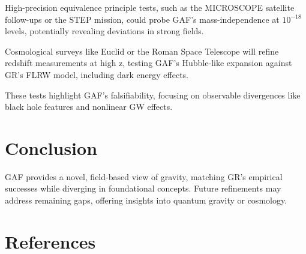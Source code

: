 \documentclass{article}
\begin{document}
High-precision equivalence principle tests, such as the MICROSCOPE satellite follow-ups or the STEP mission, could probe GAF's mass-independence at \( 10^{-18} \) levels, potentially revealing deviations in strong fields.

Cosmological surveys like Euclid or the Roman Space Telescope will refine redshift measurements at high z, testing GAF's Hubble-like expansion against GR's FLRW model, including dark energy effects.

These tests highlight GAF's falsifiability, focusing on observable divergences like black hole features and nonlinear GW effects.

\clearpage

\section{Conclusion}

GAF provides a novel, field-based view of gravity, matching GR's empirical successes while diverging in foundational concepts. Future refinements may address remaining gaps, offering insights into quantum gravity or cosmology.

\section{References}
\end{document}
